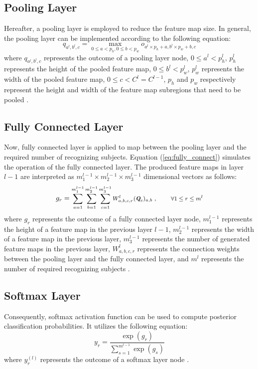 \documentclass[conference]{IEEEtran}
\begin{document}
\subsection{Pooling Layer}
Hereafter, a pooling layer is employed to reduce the feature map size. In general, the pooling layer can be implemented according to the following equation:
\begin{equation}
q_{a^{l},b^{l},c}=\underset{0\leq a<p_h,0\leq b<p_w}{\max} o_{a^{l}\times p_h+a, b^{l}\times p_w+b,c}
\label{eq:pooling_layer}
\end{equation}
where $q_{a^{l},b^{l},c}$ represents the outcome of a pooling layer node, $0\leq a^{l} <p_h^{l}$, $p_h^{l}$ represents the height of the pooled feature map, $0\leq b^{l} <p_w^{l}$, $p_w^{l}$ represents the width of the pooled feature map, $0\leq c <C^{l}=C^{l-1}$, $p_h$ and $p_w$ respectively represent the height and width of the feature map subregions that need to be pooled \cite{wu2017introduction}. 

\subsection{Fully Connected Layer}
Now, fully connected layer is applied to map between the pooling layer and the required number of recognizing subjects. Equation (\ref{eq:fully_connect}) simulates the operation of the fully connected layer. The produced feature maps in layer $l-1$ are interpreted as $m_1^{l-1} \times m_2^{l-1} \times m_3^{l-1}$ dimensional vectors as follows:
\begin{equation}
g_{r}=\text{\footnotesize $\sum_{a=1}^{m_1^{l-1}} \sum_{b=1}^{m_2^{l-1}} \sum_{c=1}^{m_3^{l-1}} W_{a,b,c,r}^{l}(\textit{\textbf{Q}}_{c})_{a,b}~, ~~~~~~~\forall 1 \leq r \leq m^{l}$}
\label{eq:fully_connect}
\end{equation}
where $g_{r}$ represents the outcome of a fully connected layer node, $m_1^{l-1}$ represents the height of a feature map in the previous layer $l-1$, $m_2^{l-1}$ represents the width of a feature map in the previous layer, $m_3^{l-1}$ represents the number of generated feature maps in the previous layer, $W_{a,b,c,r}^{l}$ represents the connection weights between the pooling layer and the fully connected layer, and $m^{l}$ represents the number of required recognizing subjects \cite{stutz2014neural}.

\subsection{Softmax Layer}
Consequently, softmax activation function can be used to compute posterior classification probabilities. It utilizes the following equation:
\begin{equation}
y_{r}=\frac{\exp(g_{r})}{\sum_{s=1}^{m^{l-1}}\exp(g_{s})} 
\label{eq:softmax}
\end{equation}
where $y_{r}^{(l)}$ represents the outcome of a softmax layer node \cite{stutz2014neural}.
\end{document}
